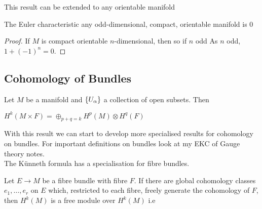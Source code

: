 \documentclass{article}
\begin{document}
\begin{remark}
	This result can be extended to any orientable manifold 
\end{remark}

\begin{corollary}
	The Euler characteristic any odd-dimensional, compact, orientable manifold is 0
\end{corollary}
\begin{proof}
	If $M$ is compact orientable $n$-dimensional, then 
	so if $n$ odd
	As $n$ odd, $1+(-1)^n=0$.
\end{proof}

\subsection{Cohomology of Bundles}

\begin{prop}
	Let $M$ be a manifold and $\left\{ U_\alpha \right\}$ a collection of open subsets. Then 
\end{prop}

\begin{prop}
	$H^k(M \times F) = \oplus_{p+q=k} H^p(M) \otimes H^q(F)$
\end{prop}

With this result we can start to develop more specialised results for cohomology on bundles. For important definitions on bundles look at my EKC of Gauge theory notes. \\
The K\"unneth formula has a specialisation for fibre bundles. 

\begin{theorem}
	Let $E\to M$ be a fibre bundle with fibre $F$. If there are global cohomology classes $e_1, \dots, e_r$ on $E$ which, restricted to each fibre, freely generate the cohomology of $F$, then $H^k(M)$ is a free module over $H^k(M)$ i.e 
\end{theorem}
\end{document}
